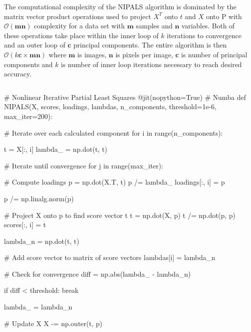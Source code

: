 \documentclass[12pt]{article}
\begin{document}
The computational complexity of the NIPALS algorithm is dominated by the matrix vector product operations used to project $X^T$ onto $t$ and $X$ onto P with $\mathcal{O}(\textbf{mn})$ complexity for a data set with $\textbf{m}$ samples and $\textbf{n}$ variables. Both of these operations take place within the inner loop of $k$ iterations to convergence and an outer loop of $\textbf{c}$ principal components. The entire algorithm is then $\mathcal{O}(k\textbf{c}\times\textbf{mn})$ where $\textbf{m}$ is images, $\textbf{n}$ is pixels per image, $\textbf{c}$ is number of principal components and $k$ is number of inner loop iterations necessary to reach desired accuracy.
\pagebreak
\begin{lstlisting}[frame=none,caption={NIPALS Algorithm},captionpos=b,label=lst:NIPALS]
\end{lstlisting}
\begin{python}
# Nonlinear Iterative Partial Least Squares
@jit(nopython=True) # Numba
def NIPALS(X, scores, loadings, lambdas, n_components,
            threshold=1e-6, max_iter=200):

    # Iterate over each calculated component
    for i in range(n_components):

        t = X[:, i]
        lambda_ = np.dot(t, t)

        # Iterate until convergence
        for j in range(max_iter):

            # Compute loadings
            p = np.dot(X.T, t)
            p /= lambda_
            loadings[:, i] = p

            p /= np.linalg.norm(p)

            # Project X onto p to find score vector t
            t = np.dot(X, p)
            t /= np.dot(p, p)
            scores[:, i] = t

            lambda_n = np.dot(t, t)

            # Add score vector to matrix of score vectors
            lambdas[i] = lambda_n

            # Check for convergence
            diff = np.abs(lambda_ - lambda_n)

            if diff < threshold:
                break

            lambda_ = lambda_n

        # Update X
        X -= np.outer(t, p)
\end{python}


\end{document}
